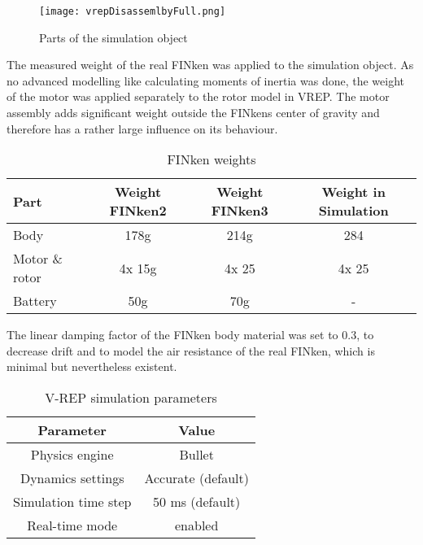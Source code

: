 \begin{figure}[h!]
 \begin{center}
  \texttt{[image: vrepDisassemlbyFull.png]}
 \end{center}
  \caption{Parts of the simulation object \label{fig:vrepParts}}
\end{figure}

The measured weight of the real FINken was applied to the simulation object. 
As no advanced modelling like calculating moments of inertia was done, the weight of the motor was applied separately to the rotor model in VREP.  The motor assembly adds significant weight outside the FINkens center of gravity and therefore has a rather large influence on its behaviour. 

\begin{table}[h]
	\centering
	\begin{tabular}{|l|c|c|c|}
    		\hline
		Part & Weight FINken2 & Weight FINken3 & Weight in Simulation \\
		\hline
    		Body & 178g &  214g & 284\\
    		\hline
		Motor \& rotor & 4x 15g & 4x 25 & 4x 25\\
    		\hline
		Battery & 50g & 70g & - \\
    		\hline
	\end{tabular}
    	\caption{FINken weights}
      	\label{tab:finkWeight}
\end{table}

The linear damping factor of the FINken body material was set to 0.3, to decrease drift and to model the air resistance of the real FINken, which is minimal but nevertheless existent.

\begin{table}[h]
	\centering
	\begin{tabular}{|c|c|}
    		\hline
		Parameter & Value \\
		\hline
    		Physics engine & Bullet\\
    		\hline
    		Dynamics settings & Accurate (default) \\
    		\hline
    		Simulation time step & 50 ms (default) \\
    		\hline
    		Real-time mode & enabled \\
    		\hline
	\end{tabular}
    	\caption{V-REP simulation parameters}
      	\label{tab:simSettings}
\end{table}

